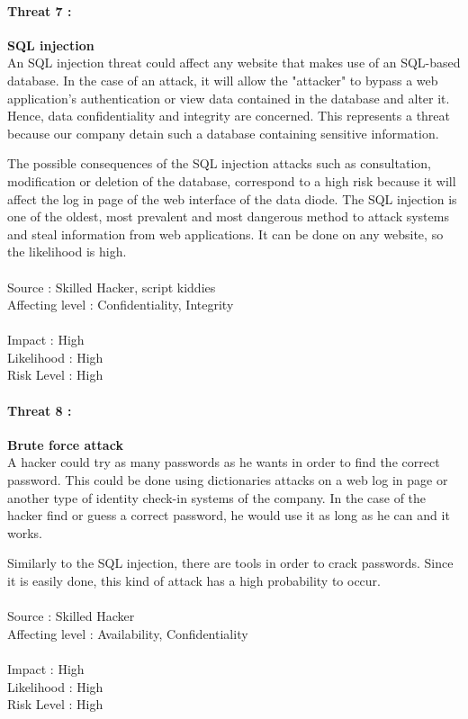 \documentclass[a4paper,10pt]{article}
\begin{document}
\paragraph{Threat 7 :}  \textbf{SQL injection} \\
\indent An SQL injection threat could affect any website that makes use of an SQL-based database.
In the case of an attack, it will allow the "attacker" to bypass a web application's authentication or view data contained in the database and alter it. Hence, data confidentiality and integrity are concerned. This represents a threat because our company detain such a database containing sensitive information.

The possible consequences of the SQL injection attacks such as consultation, modification or deletion of the database, correspond to a high risk because it will affect the log in page of the web interface of the data diode. The SQL injection is one of the oldest, most prevalent and most dangerous method to attack systems and steal information from web applications. It can be done on any website, so the likelihood is high.\\ \\
Source : Skilled Hacker, script kiddies \\ 
Affecting level : Confidentiality, Integrity \\ \\
Impact : High \\
Likelihood : High \\
Risk Level : High

\paragraph{Threat 8 :}  \textbf{Brute force attack} \\
\indent A hacker could try as many passwords as he wants in order to find the correct password. This could be done using dictionaries attacks on a web log in page or another type of identity check-in systems of the company. In the case of the hacker find or guess a correct password, he would use it as long as he can and it works.

Similarly to the SQL injection, there are tools in order to crack passwords. Since it is easily done, this kind of attack has a high probability to occur. \\ \\
Source : Skilled Hacker \\ 
Affecting level : Availability, Confidentiality \\ \\
Impact : High \\
Likelihood : High \\
Risk Level : High
\end{document}
